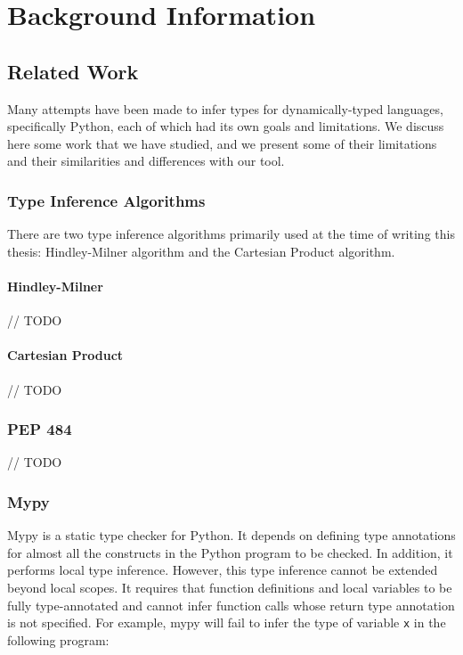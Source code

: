 
\chapter{Background Information}\label{chapter:background}

\section{Related Work}
Many attempts have been made to infer types for dynamically-typed languages, specifically Python, each of which had its own goals and limitations. We discuss here some work that we have studied, and we present some of their limitations and their similarities and differences with our tool.

\subsection{Type Inference Algorithms}
There are two type inference algorithms primarily used at the time of writing this thesis: Hindley-Milner algorithm and the Cartesian Product algorithm.

\subsubsection{Hindley-Milner}
// TODO
\subsubsection{Cartesian Product}
// TODO

\subsection{PEP 484}
// TODO

\subsection{Mypy \cite{mypy}}
Mypy is a static type checker for Python. It depends on defining type annotations for almost all the constructs in the Python program to be checked. In addition, it performs local type inference. However, this type inference cannot be extended beyond local scopes. It requires that function definitions and local variables to be fully type-annotated and cannot infer function calls whose return type annotation is not specified. For example, mypy will fail to infer the type of variable \lstinline|x| in the following program:

